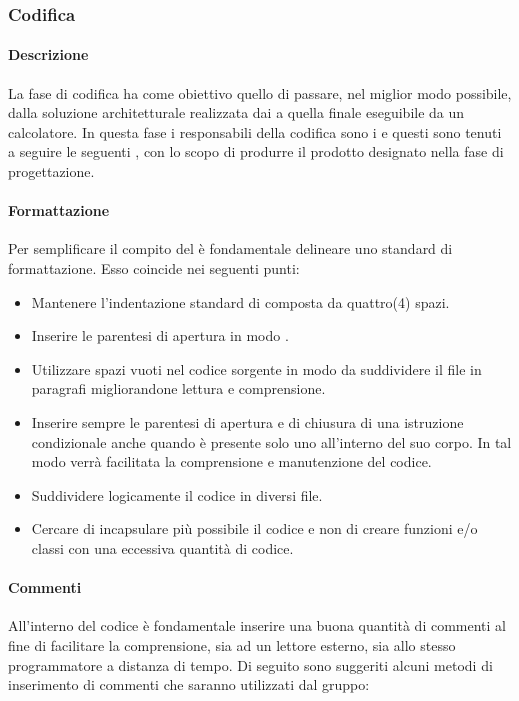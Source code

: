 \subsubsection{Codifica}
\paragraph{Descrizione}
La fase di codifica ha come obiettivo quello di passare, nel miglior modo possibile, dalla soluzione architetturale realizzata dai \textit{\ProgP} a quella finale eseguibile da un calcolatore.
In questa fase i responsabili della codifica sono i \textit{\ProgrP} e questi sono tenuti a seguire le seguenti , con lo scopo di produrre il prodotto designato nella fase di progettazione.

\paragraph{Formattazione}
Per semplificare il compito del \textit{\Prog} è fondamentale delineare uno standard di formattazione.
Esso coincide nei seguenti punti:

\begin{itemize}
\item Mantenere l'indentazione standard di  composta da quattro(4) spazi.

\item Inserire le parentesi di apertura in modo .

\item Utilizzare spazi vuoti nel codice sorgente in modo da suddividere il file in paragrafi migliorandone lettura e comprensione.

\item Inserire sempre le parentesi di apertura e di chiusura di una istruzione condizionale anche quando è presente solo uno  all'interno del suo corpo. In tal modo verrà facilitata la comprensione e manutenzione del codice.

\item Suddividere logicamente il codice in diversi file.

\item Cercare di incapsulare più possibile il codice e non di creare funzioni e/o classi con una eccessiva quantità di codice.
\end{itemize}

\paragraph{Commenti}
All'interno del codice è fondamentale inserire una buona quantità di commenti al fine di facilitare la comprensione, sia ad un lettore esterno, sia allo stesso programmatore a distanza di tempo.
Di seguito sono suggeriti alcuni metodi di inserimento di commenti che saranno utilizzati dal gruppo:

